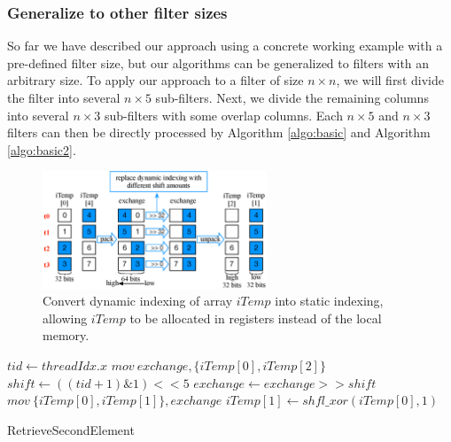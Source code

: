 \subsubsection{Generalize to other filter sizes\label{sec:otherfiltersize}}
So far we have described our approach using a concrete working example with a pre-defined
filter size, but our algorithms can be generalized to filters with an arbitrary size. To apply our approach to a filter of size $n \times
n$, we will first divide the filter into several $n \times 5$ sub-filters. Next, we divide the remaining columns into several $n \times 3$
sub-filters with some overlap columns. 
 Each $n \times 5$ and $n \times 3$ filters can then be directly processed by Algorithm \ref{algo:basic} and Algorithm \ref{algo:basic2}.


\begin{figure}[t!]
	\centering
	\includegraphics[width=0.8\columnwidth,height=3.5cm]{./figure/exchange.eps}
	\vspace{-3mm}
\caption{Convert dynamic indexing of array $iTemp$ into static indexing, allowing  $iTemp$ to be allocated in registers instead of the local memory.}
\label{fig:exchange}
\end{figure}

\begin{algorithm}[t!]
\small
	$tid \gets threadIdx.x$\;
	$mov\ exchange, \{iTemp[0], iTemp[2]\}$\;
	$shift \gets ((tid+1)\&1)<<5$\;
	$exchange \gets exchange >> shift$\;
	$mov\ \{iTemp[0],iTemp[1]\}, exchange$\;
	$iTemp[1] \gets shfl\_xor(iTemp[0],1)$\;	
	\caption{RetrieveSecondElement}
	\label{algo:basic2}
\end{algorithm}


